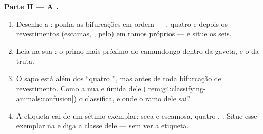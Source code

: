 \begin{problem}
\medskip\noindent\textbf{Parte II --- A .}
\begin{enumerate}[resume]
  \item Desenhe a : ponha as bifurcações em ordem --- , quatro  e depois os revestimentos (escamas,
        , pelo) em ramos próprios --- e situe os seis.
  \item Leia na sua : o primo mais próximo do camundongo dentro
        da gaveta, e o da truta.
  \item O sapo está além dos ``quatro '', mas antes de toda
        bifurcação de revestimento. Como a  nua e úmida dele
        (\cref{rem:g4:classifying-animals:confusion}) o classifica, e
        onde o ramo dele sai?
  \item A etiqueta cai de um sétimo exemplar:  seca e escamosa,
        quatro , . Situe esse exemplar na
         e diga a classe dele --- sem ver a etiqueta.
\end{enumerate}


\end{problem}
